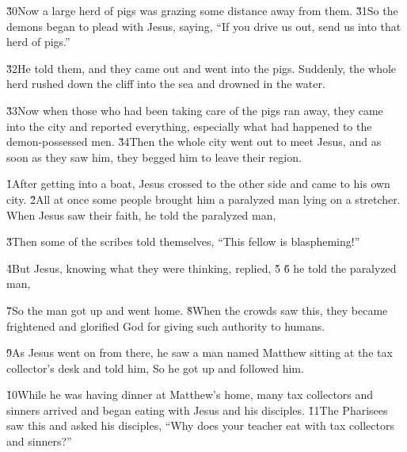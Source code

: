 \v{30}Now a large herd of pigs was grazing some distance away from them. \v{31}So the demons began to plead with Jesus, saying, ``If you drive us out, send us into that herd of pigs.''

\v{32}He told them,  and they came out and went into the pigs. Suddenly, the whole herd rushed down the cliff into the sea and drowned in the water.

\v{33}Now when those who had been taking care of the pigs ran away, they came into the city and reported everything, especially what had happened to the demon-possessed men. \v{34}Then the whole city went out to meet Jesus, and as soon as they saw him, they begged him to leave their region.

\v{1}After getting into a boat, Jesus crossed to the other side and came to his own city. \v{2}All at once some people brought him a paralyzed man lying on a stretcher. When Jesus saw their faith, he told the paralyzed man, 

\v{3}Then some of the scribes told themselves, ``This fellow is blaspheming!''

\v{4}But Jesus, knowing what they were thinking, replied,  \v{5} \v{6} he told the paralyzed man, 

\v{7}So the man got up and went home. \v{8}When the crowds saw this, they became frightened and glorified God for giving such authority to humans.

\v{9}As Jesus went on from there, he saw a man named Matthew sitting at the tax collector's desk and told him,  So he got up and followed him.

\v{10}While he was having dinner at Matthew's home, many tax collectors and sinners arrived and began eating with Jesus and his disciples. \v{11}The Pharisees saw this and asked his disciples, ``Why does your teacher eat with tax collectors and sinners?''

